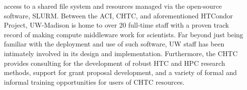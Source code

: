 \documentclass[dvips,12pt]{article}
\begin{document}
access to a shared file system and resources managed via the open-source
software, SLURM.  Between the ACI, \gls{CHTC}, and aforementioned HTCondor
Project, UW-Madison is home to over 20 full-time staff with a proven track
record of making compute middleware work for scientists. Far beyond just being
familiar with the deployment and use of such software, UW staff has been
intimately involved in its design and implementation. Furthermore, the
\gls{CHTC} provides consulting for the development of robust HTC and HPC
research methods, support for grant proposal development, and a variety of
formal and informal training opportunities for users of \gls{CHTC} resources.




\label{LastPage}
\end{document}
